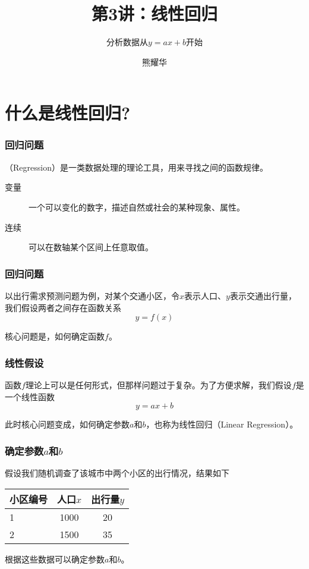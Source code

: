 \documentclass[14pt]{beamer}
\title{第3讲：线性回归}
\subtitle{分析数据从$y=ax+b$开始}
\author{熊耀华}
\institute{交通工程系}
\let\emph\relax %
\begin{document}
\begin{frame}
    \titlepage
\end{frame}

\section{什么是线性回归?}

\begin{frame}
    \frametitle{回归问题}

    \emph{回归}（Regression）是一类数据处理的理论工具，用来寻找\emph{连续变量}之间的函数规律。

    \begin{description}
        \item[变量] 一个可以变化的数字，描述自然或社会的某种现象、属性。
        \item[连续] 可以在数轴某个区间上任意取值。
    \end{description}
\end{frame}

\begin{frame}
    \frametitle{回归问题}
    以出行需求预测问题为例，对某个交通小区，令$x$表示人口、$y$表示交通出行量，我们假设两者之间存在函数关系
        \[ y = f(x) \]

    核心问题是，如何确定函数$f$。
\end{frame}

\begin{frame}
    \frametitle{线性假设}
    函数$f$理论上可以是任何形式，但那样问题过于复杂。为了方便求解，我们假设$f$是一个线性函数
    \[y=ax+b\]

    此时核心问题变成，如何确定参数$a$和$b$，也称为线性回归（Linear Regression）。
\end{frame}

\begin{frame}
    \frametitle{确定参数$a$和$b$}
    假设我们随机调查了该城市中两个小区的出行情况，结果如下
    \begin{table}
        \begin{tabular}{l c c}
            小区编号 & 人口$x$ & 出行量$y$ \\
            \hline\hline
            1   & 1000  & 20 \\
            2   & 1500  & 35 \\
            
        \end{tabular}
    \end{table}

    根据这些数据可以确定参数$a$和$b$。
\end{frame}
\end{document}
